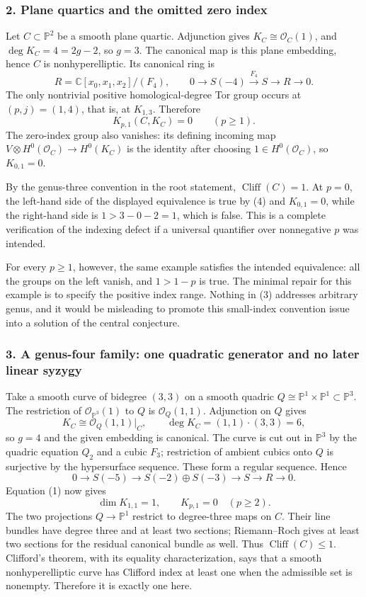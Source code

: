 \documentclass[11pt]{article}
\begin{document}
\subsubsection{2. Plane quartics and the omitted zero index}
Let $C\subset\mathbb P^2$ be a smooth plane quartic. Adjunction gives $K_C\cong\mathcal O_C(1)$, and $\deg K_C=4=2g-2$, so $g=3$. The canonical map is this plane embedding, hence $C$ is nonhyperelliptic. Its canonical ring is
\[
 R=\mathbb C[x_0,x_1,x_2]/(F_4),\qquad
 0\to S(-4)\xrightarrow{F_4}S\to R\to0.               \tag{3}
\]
The only nontrivial positive homological-degree Tor group occurs at $(p,j)=(1,4)$, that is, at $K_{1,3}$. Therefore
\[
 K_{p,1}(C,K_C)=0\qquad(p\ge1).                       \tag{4}
\]
The zero-index group also vanishes: its defining incoming map
$V\otimes H^0(\mathcal O_C)\to H^0(K_C)$ is the identity after choosing $1\in H^0(\mathcal O_C)$, so $K_{0,1}=0$.

By the genus-three convention in the root statement, $\operatorname{Cliff}(C)=1$. At $p=0$, the left-hand side of the displayed equivalence is true by (4) and $K_{0,1}=0$, while the right-hand side is $1>3-0-2=1$, which is false. This is a complete verification of the indexing defect if a universal quantifier over nonnegative $p$ was intended.

For every $p\ge1$, however, the same example satisfies the intended equivalence: all the groups on the left vanish, and $1>1-p$ is true. The minimal repair for this example is to specify the positive index range. Nothing in (3) addresses arbitrary genus, and it would be misleading to promote this small-index convention issue into a solution of the central conjecture.

\subsubsection{3. A genus-four family: one quadratic generator and no later linear syzygy}
Take a smooth curve of bidegree $(3,3)$ on a smooth quadric
$Q\cong\mathbb P^1\times\mathbb P^1\subset\mathbb P^3$.
The restriction of $\mathcal O_{\mathbb P^3}(1)$ to $Q$ is $\mathcal O_Q(1,1)$. Adjunction on $Q$ gives
\[
 K_C\cong\mathcal O_Q(1,1)|_C,\qquad
 \deg K_C=(1,1)\cdot(3,3)=6,
\]
so $g=4$ and the given embedding is canonical. The curve is cut out in $\mathbb P^3$ by the quadric equation $Q_2$ and a cubic $F_3$; restriction of ambient cubics onto $Q$ is surjective by the hypersurface sequence. These form a regular sequence. Hence
\[
0\to S(-5)\to S(-2)\oplus S(-3)\to S\to R\to0.       \tag{5}
\]
Equation (1) now gives
\[
 \dim K_{1,1}=1,\qquad K_{p,1}=0\quad(p\ge2).         \tag{6}
\]
The two projections $Q\to\mathbb P^1$ restrict to degree-three maps on $C$. Their line bundles have degree three and at least two sections; Riemann--Roch gives at least two sections for the residual canonical bundle as well. Thus $\operatorname{Cliff}(C)\le1$. Clifford's theorem, with its equality characterization, says that a smooth nonhyperelliptic curve has Clifford index at least one when the admissible set is nonempty. Therefore it is exactly one here.
\end{document}
